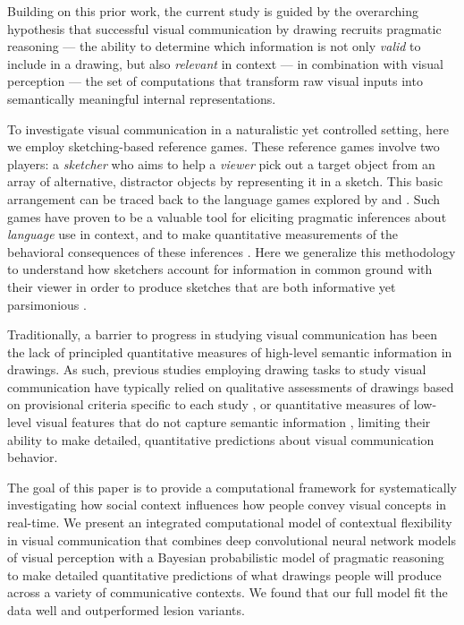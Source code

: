 \documentclass[9pt,twocolumn,twoside]{pnas-new}
\begin{document}
Building on this prior work, the current study is guided by the overarching hypothesis that successful visual communication by drawing recruits pragmatic reasoning \cite{goodman2016pragmatic,clark1996using,wilson1986relevance,grice1975syntax} --- the ability to determine which information is not only \textit{valid} to include in a drawing, but also \textit{relevant} in context --- in combination with visual perception --- the set of computations that transform raw visual inputs into semantically meaningful internal representations.

To investigate visual communication in a naturalistic yet controlled setting, here we employ sketching-based reference games. These reference games involve two players: a \textit{sketcher} who aims to help a \textit{viewer} pick out a target object from an array of alternative, distractor objects by representing it in a sketch. This basic arrangement can be traced back to the language games explored by \citep{wittgenstein1953philosophical} and \citep{Lewis69_Convention}. Such games have proven to be a valuable tool for eliciting pragmatic inferences about \textit{language} use in context, and to make quantitative measurements of the behavioral consequences of these inferences \cite{goodman2016pragmatic,kao2014formalizing,goodman2013knowledge,frank2012predicting}. Here we generalize this methodology to understand how sketchers account for information in common ground with their viewer in order to produce sketches that are both informative \cite{grice1975syntax,wilson1986relevance} yet parsimonious \cite{zipf1936psycho}.

Traditionally, a barrier to progress in studying visual communication has been the lack of principled quantitative measures of high-level semantic information in drawings. As such, previous studies employing drawing tasks to study visual communication have typically relied on qualitative assessments of drawings based on provisional criteria specific to each study \cite{Healey:2007vq}, or quantitative measures of low-level visual features that do not capture semantic information \cite{Garrod:2007wk}, limiting their ability to make detailed, quantitative predictions about visual communication behavior.

The goal of this paper is to provide a computational framework for systematically investigating how social context influences how people convey visual concepts in real-time. We present an integrated computational model of contextual flexibility in visual communication that combines deep convolutional neural network models of visual perception with a Bayesian probabilistic model of pragmatic reasoning \cite{goodman2016pragmatic} to make detailed quantitative predictions of what drawings people will produce across a variety of communicative contexts. We found that our full model fit the data well and outperformed lesion variants.
\end{document}
